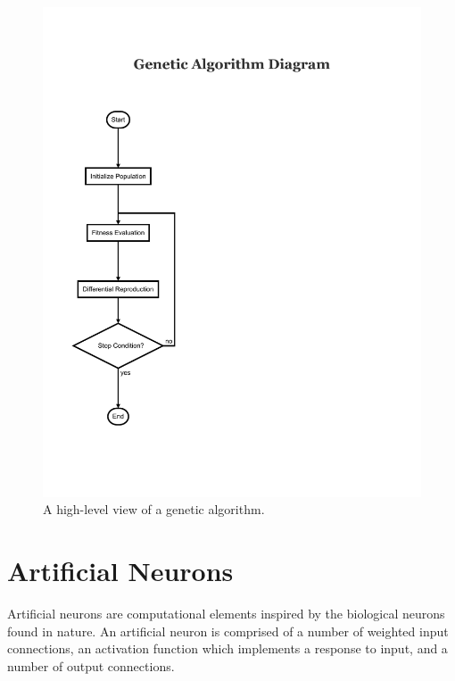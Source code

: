 \documentclass[master]{outhesis}
\begin{document}
\begin{figure}[H]
	\centering
	\includegraphics{GeneticAlgorithm.pdf}
	\caption{A high-level view of a genetic algorithm.}
\end{figure}

\section{Artificial Neurons}


Artificial neurons are computational elements inspired by the biological neurons found in nature.
An artificial neuron is comprised of a number of weighted input connections, an activation function which implements a response to input, and a number of output connections.
\end{document}
